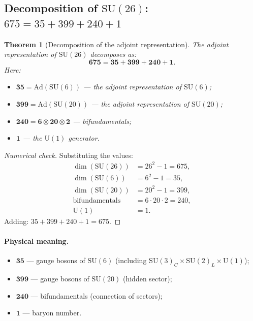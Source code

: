 \documentclass[11pt,a4paper]{article}
\newcommand{\SU}{\mathrm{SU}}
\newcommand{\Ad}{\mathrm{Ad}}
\newtheorem{theorem}{Theorem}[section]
\theoremstyle{definition}
\begin{document}
\subsection{Decomposition of $\SU(26)$: $675 = 35 + 399 + 240 + 1$}
\label{subsec:su26-decomposition}

\begin{theorem}[Decomposition of the adjoint representation]
\label{thm:adjoint-decomposition}
The adjoint representation of $\SU(26)$ decomposes as:
\begin{equation}
    \boxed{
    \mathbf{675} = \mathbf{35} + \mathbf{399} + \mathbf{240} + \mathbf{1}.
    }
    \label{eq:675-decomposition}
\end{equation}
Here:
\begin{itemize}
    \item $\mathbf{35} = \Ad(\SU(6))$ — the adjoint 
          representation of $\SU(6)$;
    \item $\mathbf{399} = \Ad(\SU(20))$ — the adjoint 
          representation of $\SU(20)$;
    \item $\mathbf{240} = \mathbf{6} \otimes \mathbf{20} 
          \otimes \mathbf{2}$ — bifundamentals;
    \item $\mathbf{1}$ — the $\mathrm{U}(1)$ generator.
\end{itemize}
\end{theorem}

\begin{proof}[Numerical check]
Substituting the values:
\begin{align}
    \dim(\SU(26)) &= 26^2 - 1 = 675, \\
    \dim(\SU(6)) &= 6^2 - 1 = 35, \\
    \dim(\SU(20)) &= 20^2 - 1 = 399, \\
    \text{bifundamentals} &= 6 \cdot 20 \cdot 2 = 240, \\
    \mathrm{U}(1) &= 1.
\end{align}
Adding: $35 + 399 + 240 + 1 = 675$. \checkmark
\end{proof}

\paragraph{Physical meaning.}
\begin{itemize}
    \item $\mathbf{35}$ — gauge bosons of $\SU(6)$ 
          (including $\SU(3)_C \times \SU(2)_L \times \mathrm{U}(1)$);
    \item $\mathbf{399}$ — gauge bosons of $\SU(20)$ 
          (hidden sector);
    \item $\mathbf{240}$ — bifundamentals (connection of sectors);
    \item $\mathbf{1}$ — baryon number.
\end{itemize}
\end{document}
